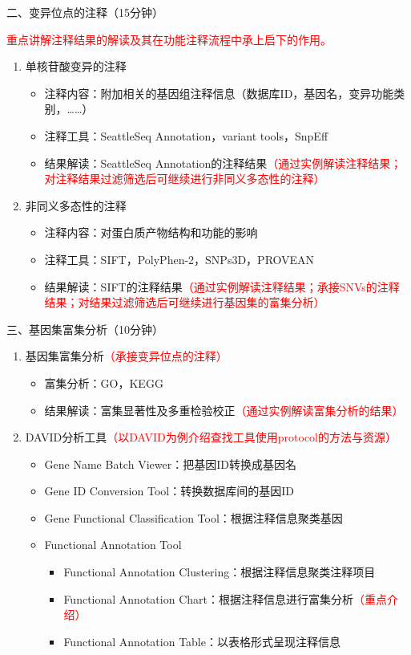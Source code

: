 \documentclass{TIJMUjiaoanLL}
\begin{document}
\noindent
二、变异位点的注释（15分钟）

\textcolor{red}{重点讲解注释结果的解读及其在功能注释流程中承上启下的作用。}
\begin{enumerate}
  \item 单核苷酸变异的注释
    \begin{itemize}
      \item 注释内容：附加相关的基因组注释信息（数据库ID，基因名，变异功能类别，……）
      \item 注释工具：SeattleSeq Annotation，variant tools，SnpEff
      \item 结果解读：SeattleSeq Annotation的注释结果\textcolor{red}{（通过实例解读注释结果；对注释结果过滤筛选后可继续进行非同义多态性的注释）}
    \end{itemize}
  \item 非同义多态性的注释
    \begin{itemize}
      \item 注释内容：对蛋白质产物结构和功能的影响
      \item 注释工具：SIFT，PolyPhen-2，SNPs3D，PROVEAN
      \item 结果解读：SIFT的注释结果\textcolor{red}{（通过实例解读注释结果；承接SNVs的注释结果；对结果过滤筛选后可继续进行基因集的富集分析）}
    \end{itemize}
\end{enumerate}

\noindent
三、基因集富集分析（10分钟）
\begin{enumerate}
  \item 基因集富集分析\textcolor{red}{（承接变异位点的注释）}
    \begin{itemize}
      \item 富集分析：GO，KEGG
      \item 结果解读：富集显著性及多重检验校正\textcolor{red}{（通过实例解读富集分析的结果）}
    \end{itemize}
  \item DAVID分析工具\textcolor{red}{（以DAVID为例介绍查找工具使用protocol的方法与资源）}
    \begin{itemize}
      \item Gene Name Batch Viewer：把基因ID转换成基因名
      \item Gene ID Conversion Tool：转换数据库间的基因ID
      \item Gene Functional Classification Tool：根据注释信息聚类基因
      \item Functional Annotation Tool
	\begin{itemize}
          \item Functional Annotation Clustering：根据注释信息聚类注释项目
          \item Functional Annotation Chart：根据注释信息进行富集分析\textcolor{red}{（重点介绍）}
          \item Functional Annotation Table：以表格形式呈现注释信息
	\end{itemize}
    \end{itemize}
\end{enumerate}
\end{document}
